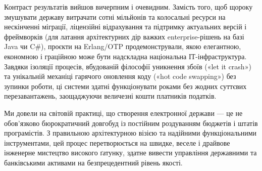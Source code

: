 Контраст результатів вийшов вичерпним і очевидним. Замість того, щоб щороку змушувати державу витрачати сотні мільйонів та колосальні ресурси на нескінченні міграції, ліцензійні відрахування та підтримку актуальних версій і фреймворків (для латання архітектурних дір важких enterprise-рішень на базі Java чи C\#), проєкти на Erlang/OTP продемонстрували, якою елегантною, економною і граційною може бути надскладна національна ІТ-інфраструктура. Завдяки ізоляції процесів, вбудованій філософії уникнення збоїв («let it crash») та унікальній механіці гарячого оновлення коду («hot code swapping») без зупинки роботи, ці системи здатні функціонувати роками без жодних суттєвих перезавантажень, заощаджуючи величезні кошти платників податків.

Ми довели на світовій практиці, що створення електронної держави — це не обов'язково бюрократичний довгобуд із постійним роздуванням бюджетів і штатів програмістів. З правильною архітектурною візією та надійними функціональними інструментами, цей процес перетворюється на швидке, веселе і драйвове інженерне мистецтво високого ґатунку, здатне вивести управління державними та банківськими активами на безпрецедентний рівень якості.
